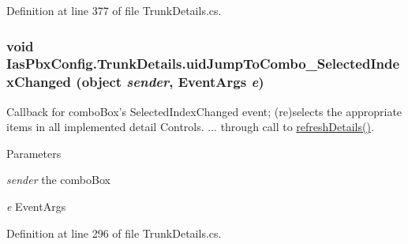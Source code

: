 Definition at line 377 of file TrunkDetails.cs.\hypertarget{class_ias_pbx_config_1_1_trunk_details_a05b0359576cfc66eda821a9e8e8f7e25}{
\subsubsection[{uidJumpToCombo\_\-SelectedIndexChanged}]{\setlength{\rightskip}{0pt plus 5cm}void IasPbxConfig.TrunkDetails.uidJumpToCombo\_\-SelectedIndexChanged (object {\em sender}, \/  EventArgs {\em e})}}
\label{class_ias_pbx_config_1_1_trunk_details_a05b0359576cfc66eda821a9e8e8f7e25}


Callback for comboBox's SelectedIndexChanged event; (re)selects the appropriate items in all implemented detail Controls. ... through call to \hyperlink{class_ias_pbx_config_1_1_trunk_details_aacce011c33fa9fed315eb27c9d9643ea}{refreshDetails()}. 
\begin{DoxyParams}{Parameters}
\item[{\em sender}]the comboBox \item[{\em e}]EventArgs \end{DoxyParams}


Definition at line 296 of file TrunkDetails.cs.

